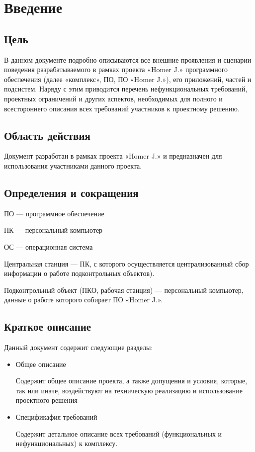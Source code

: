 \section{Введение}

\subsection{Цель}
В данном документе подробно описываются все внешние проявления и сценарии поведения разрабатываемого в рамках проекта «Homer J.»  программного обеспечения (далее «комплекс», ПО, ПО «Homer J.»), его приложений, частей и подсистем. Наряду с этим приводится перечень нефункциональных требований, проектных ограничений и других аспектов, необходимых для полного и всестороннего описания всех требований участников к проектному решению.

\subsection{Область действия}
Документ разработан в рамках проекта «Homer J.» и предназначен для использования участниками данного проекта.

\subsection{Определения и сокращения}

ПО --- программное обеспечение

ПК --- персональный компьютер

ОС --- операционная система

Центральная станция --- ПК, с которого осуществляется централизованный сбор информации о работе подконтрольных объектов).

Подконтрольный объект (ПКО, рабочая станция) --- персональный компьютер, данные о работе которого собирает ПО «Homer J.».


\subsection{Краткое описание}
Данный документ содержит следующие разделы:

\begin{itemize}
\item Общее описание

Содержит общее описание проекта, а также допущения и условия, которые, так или иначе, воздействуют на техническую реализацию и использование проектного решения

\item Спецификафия требований

Содержит детальное описание всех требований (функциональных и нефункциональных) к комплексу.
\end{itemize}

